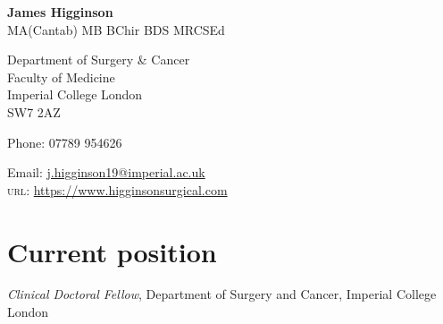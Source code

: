 \documentclass[12pt]{article} %
\begin{document}

{\LARGE\bfseries James Higginson} %
\\{\Large MA(Cantab) MB BChir BDS MRCSEd}
\bigskip\bigskip\medskip %

Department of Surgery \& Cancer\\
Faculty of Medicine\\ %
Imperial College London\\
SW7 2AZ

\medskip %

Phone: 07789 954626\\ %
\medskip %

Email: \href{mailto:j.higginson19@imperial.ac.uk}{j.higginson19@imperial.ac.uk}\\ %
\textsc{url}: \href{https://www.higginsonsurgical.com}{https://www.higginsonsurgical.com}\\ %

\vspace{0.06\textheight} %


\section*{Current position}

\emph{Clinical Doctoral Fellow}, Department of Surgery and Cancer, Imperial College London%













\end{document}
